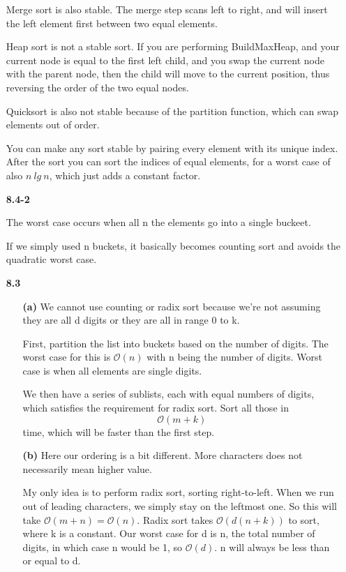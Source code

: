 \documentclass{article}
\begin{document}
\begin{enumerate}
	Merge sort is also stable. The merge step scans left to right, and will insert the left element first between two equal elements. 

	Heap sort is not a stable sort. If you are performing BuildMaxHeap, and your
	current node is equal to the first left child, and you swap the current node
	with the parent node, then the child will move to the current position, thus
	reversing the order of the two equal nodes.

	Quicksort is also not stable because of the partition function, which can swap elements out of order.

	You can make any sort stable by pairing every element with its unique index.
	After the sort you can sort the indices of equal elements, for a worst case
	of also $n\ lg\ n$, which just adds a constant factor.

\item[\textbf{8.4-2}]

	The worst case occurs when all n the elements go into a single buckeet.

	If we simply used n buckets, it basically becomes counting sort and avoids the quadratic worst case.

\item[\textbf{8.3}]

	\begin{enumerate}
		\item[\textbf{(a)}]
			We cannot use counting or radix sort because we're not assuming they are all d digits or they are all in range 0 to k.

			First, partition the list into buckets based on the number of digits. The worst case for this is $\mathcal{O}(n)$ with n being the number of digits. Worst case is when all elements are single digits.

			We then have a series of sublists, each with equal numbers of digits, which satisfies the requirement for radix sort. Sort all those in $$\mathcal{O}(m + k)$$ time, which will be faster than the first step.
		\item[\textbf{(b)}]
			Here our ordering is a bit different. More characters does not necessarily mean higher value.

			My only idea is to perform radix sort, sorting right-to-left. When we run out of leading characters, we simply stay on the leftmost one. So this will take $\mathcal{O}(m + n) = \mathcal{O}(n)$. Radix sort takes $\mathcal{O}(d(n+k))$ to sort, where k is a constant. Our worst case for d is n, the total number of digits, in which case n would be 1, so $\mathcal{O}(d)$. n will always be less than or equal to d. 

	\end{enumerate}

\end{enumerate}
\end{document}

